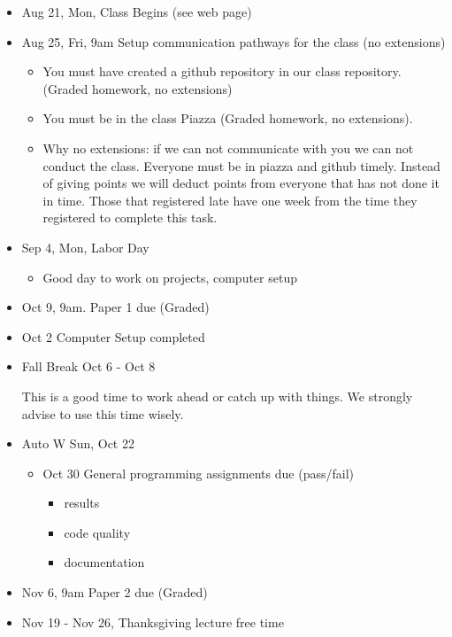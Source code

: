 \begin{itemize}
\item
  Aug 21, Mon, Class Begins (see web page)
\item
  Aug 25, Fri, 9am Setup communication pathways for the class (no
  extensions)

  \begin{itemize}
  \tightlist
  \item
    You must have created a github repository in our class repository.
    (Graded homework, no extensions)
  \item
    You must be in the class Piazza (Graded homework, no extensions).
  \item
    Why no extensions: if we can not communicate with you we can not
    conduct the class. Everyone must be in piazza and github timely.
    Instead of giving points we will deduct points from everyone that
    has not done it in time. Those that registered late have one week
    from the time they registered to complete this task.
  \end{itemize}
\item
  Sep 4, Mon, Labor Day

  \begin{itemize}
  \tightlist
  \item
    Good day to work on projects, computer setup
  \end{itemize}
\item
  Oct 9, 9am. Paper 1 due (Graded)
\item
  Oct 2 Computer Setup completed
\item
  Fall Break Oct 6 - Oct 8

  This is a good time to work ahead or catch up with things. We strongly
  advise to use this time wisely.
\item
  Auto W Sun, Oct 22

  \begin{itemize}
  \tightlist
  \item
    Oct 30 General programming assignments due (pass/fail)

    \begin{itemize}
    \tightlist
    \item
      results
    \item
      code quality
    \item
      documentation
    \end{itemize}
  \end{itemize}
\item
  Nov 6, 9am Paper 2 due (Graded)
\item
  Nov 19 - Nov 26, Thanksgiving lecture free time


\end{itemize}
